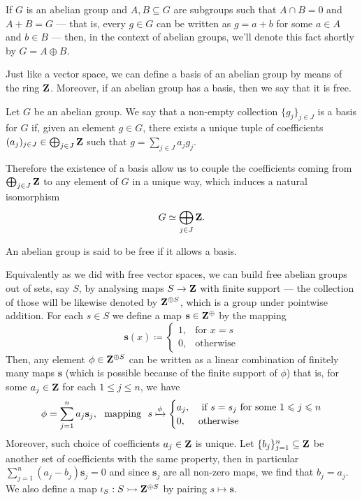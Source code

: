 If \(G\) is an abelian group and \(A, B \subseteq G\) are subgroups such that
\(A \cap B = 0\) and \(A + B = G\) --- that is, every \(g \in G\) can be
written as \(g = a + b\) for some \(a \in A\) and \(b \in B\) --- then, in the
context of abelian groups, we'll denote this fact shortly by \(G = A \oplus B\).

Just like a vector space, we can define a basis of an abelian group by means of
the ring \(\Z\). Moreover, if an abelian group has a basis, then we say that it
is free.

\begin{definition}[Basis]
    \label{def:Ab-basis}
    Let \(G\) be an abelian group. We say that a non-empty collection
    \(\{g_j\}_{j \in J}\) is a basis for \(G\) if, given an element \(g \in G\),
    there exists a unique tuple of coefficients
    \((a_j)_{j \in J} \in \bigoplus_{j \in J} \Z\) such that
    \(g = \sum_{j \in J} a_j g_j\).
\end{definition}

Therefore the existence of a basis allow us to couple the coefficients coming
from \(\bigoplus_{j \in J} \Z\) to any element of \(G\) in a unique way, which
induces a natural isomorphism
\[
    G \iso \bigoplus_{j \in J} \Z.
\]

\begin{definition}\label{def:Ab-free}
    An abelian group is said to be free if it allows a basis.
\end{definition}

Equivalently as we did with free vector spaces, we can build free abelian groups
out of sets, say \(S\), by analysing maps \(S \to \Z\) with finite support ---
the collection of those will be likewise denoted by \(\Z^{\oplus S}\), which is
a group under pointwise addition. For each \(s \in S\) we define a map
\(\mathbf{s} \in \Z^{\oplus}\) by the mapping
\[
    \mathbf{s}(x) \coloneq
    \begin{cases}
        1, & \text{for } x = s \\
        0, & \text{otherwise}
    \end{cases}
\]
Then, any element \(\phi \in \Z^{\oplus S}\) can be written as a linear
combination of finitely many maps \(\mathbf{s}\) (which is possible because of
the finite support of \(\phi\)) that is, for some \(a_j \in \Z\) for each
\(1 \leq j \leq n\), we have
\[
    \phi = \sum_{j=1}^n a_j \mathbf{s}_j,\ \text{ mapping }\
    s \xmapsto \phi
    \begin{cases}
        a_j, & \text{ if } s = s_j \text{ for some } 1 \leq j \leq n \\
        0,   & \text{otherwise}
    \end{cases}
\]
Moreover, such choice of coefficients \(a_j \in \Z\) is unique. Let
\(\{b_{j}\}_{j=1}^n \subseteq \Z\) be another set of coefficients with the same
property, then in particular \(\sum_{j=1}^n (a_j - b_j) \mathbf{s}_j = 0\) and
since \(\mathbf{s}_j\) are all non-zero maps, we find that \(b_j = a_j\). We
also define a map \(\iota_S: S \mono \Z^{\oplus S}\) by pairing
\(s \mapsto \mathbf{s}\).

